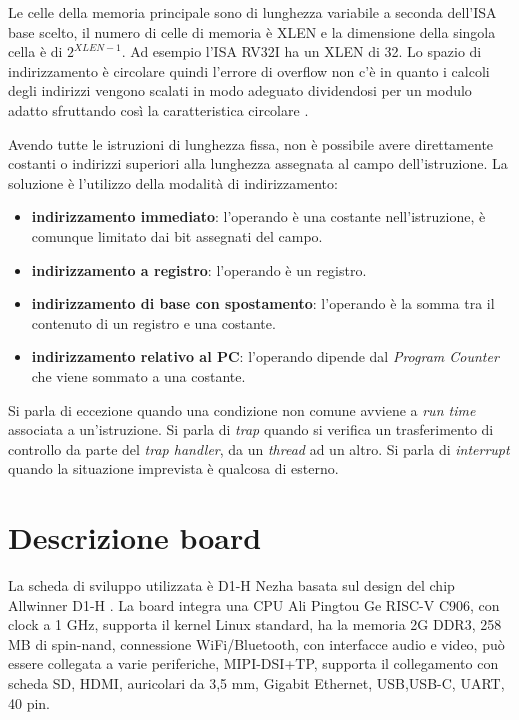 \documentclass[12pt, a4paper]{report}
\begin{document}
Le celle della memoria principale sono di lunghezza variabile a seconda dell'ISA base scelto, il numero di celle di memoria è XLEN e la dimensione della singola cella è di $2^{XLEN - 1}$. Ad esempio l'ISA RV32I ha un XLEN di 32. Lo spazio di indirizzamento è circolare quindi l'errore di overflow non c'è in quanto i calcoli degli indirizzi vengono scalati in modo adeguato dividendosi per un modulo adatto sfruttando così la caratteristica circolare \cite{ISA}.


Avendo tutte le istruzioni di lunghezza fissa, non è possibile avere direttamente costanti o indirizzi superiori alla lunghezza assegnata al campo dell'istruzione. La soluzione è l'utilizzo della modalità di indirizzamento:
\begin{itemize}
	\item \textbf{indirizzamento immediato}: l’operando è una costante nell’istruzione, è comunque limitato dai bit assegnati del campo.
	\item \textbf{indirizzamento a registro}: l’operando è un registro.
	\item \textbf{indirizzamento di base con spostamento}: l’operando è la somma tra il
contenuto di un registro e una costante.
\item \textbf{indirizzamento relativo al PC}: l'operando dipende dal \textit{Program Counter} che viene sommato a una costante.
\end{itemize}


Si parla di eccezione quando una condizione non comune avviene a \textit{run time} associata a un'istruzione.
Si parla di \textit{trap} quando si verifica un trasferimento di controllo da parte del \textit{trap handler}, da un \textit{thread} ad un altro. Si parla di \textit{interrupt} quando la situazione imprevista è qualcosa di esterno.



\section{Descrizione board} 

La scheda di sviluppo utilizzata è D1-H Nezha basata sul design del chip Allwinner D1-H \cite{DocH1}. La board integra una CPU Ali Pingtou Ge RISC-V C906, con clock a 1 GHz, supporta il kernel Linux standard, ha la memoria 2G DDR3, 258 MB di spin-nand, connessione WiFi/Bluetooth, con interfacce audio e video, può essere collegata a varie periferiche, MIPI-DSI+TP, supporta il collegamento con scheda SD, HDMI, auricolari da 3,5 mm, Gigabit Ethernet, USB,USB-C, UART, 40 pin.
\end{document}
